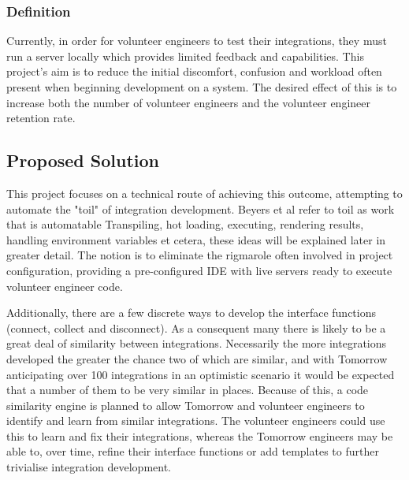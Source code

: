 \documentclass[jou,apacite]{apa6}
\begin{document}
\subsubsection{Definition}
Currently, in order for volunteer engineers to test their integrations, they must run a server locally which provides limited feedback and capabilities. This project’s aim is to reduce the initial discomfort, confusion and workload often present when beginning development on a system. The desired effect of this is to increase both the number of volunteer engineers and the volunteer engineer retention rate.

\subsection{Proposed Solution}
This project focuses on a technical route of achieving this outcome, attempting to automate the "toil" of integration development. Beyers et al \cite{beyerjonespetoffmurphy} refer to toil as work that is automatable Transpiling, hot loading, executing, rendering results, handling environment variables et cetera, these ideas will be explained later in greater detail. The notion is to eliminate the rigmarole often involved in project configuration, providing a pre-configured IDE with live servers ready to execute volunteer engineer code. 

Additionally, there are a few discrete ways to develop the interface functions (connect, collect and disconnect). As a consequent many there is likely to be a great deal of similarity between integrations. Necessarily the more integrations developed the greater the chance two of which are similar, and with Tomorrow anticipating over 100 integrations in an optimistic scenario it would be expected that a number of them to be very similar in places. Because of this, a code similarity engine is planned to allow Tomorrow and volunteer engineers to identify and learn from similar integrations. The volunteer engineers could use this to learn and fix their integrations, whereas the Tomorrow engineers may be able to, over time, refine their interface functions or add templates to further trivialise integration development.
\end{document}
